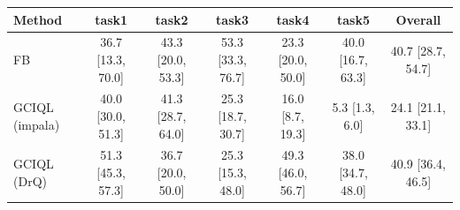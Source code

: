\begin{tabular}{lcccccc}
\toprule
Method & task1 & task2 & task3 & task4 & task5 & Overall \\
\midrule
FB & 36.7 \scriptsize[13.3, 70.0] & 43.3 \scriptsize[20.0, 53.3] & 53.3 \scriptsize[33.3, 76.7] & 23.3 \scriptsize[20.0, 50.0] & 40.0 \scriptsize[16.7, 63.3] & 40.7 \scriptsize[28.7, 54.7] \\
GCIQL (impala) & 40.0 \scriptsize[30.0, 51.3] & 41.3 \scriptsize[28.7, 64.0] & 25.3 \scriptsize[18.7, 30.7] & 16.0 \scriptsize[8.7, 19.3] & 5.3 \scriptsize[1.3, 6.0] & 24.1 \scriptsize[21.1, 33.1] \\
GCIQL (DrQ) & 51.3 \scriptsize[45.3, 57.3] & 36.7 \scriptsize[20.0, 50.0] & 25.3 \scriptsize[15.3, 48.0] & 49.3 \scriptsize[46.0, 56.7] & 38.0 \scriptsize[34.7, 48.0] & 40.9 \scriptsize[36.4, 46.5] \\
\bottomrule
\end{tabular}
